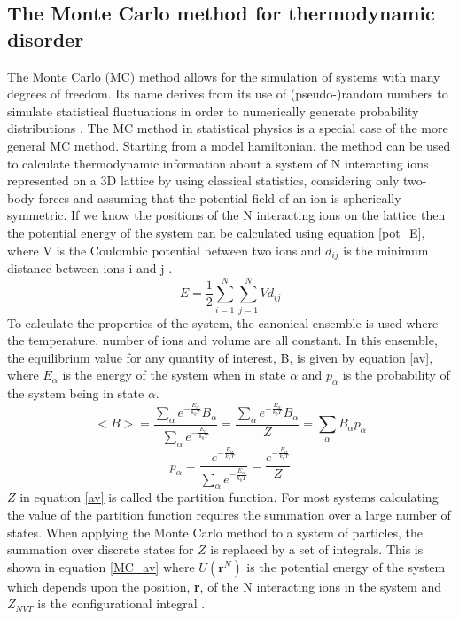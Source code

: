 \documentclass[11pt, twoside]{report}
\begin{document}
\subsection{The Monte Carlo method for thermodynamic disorder}
The Monte Carlo (MC) method allows for the simulation of systems with many degrees of freedom. Its name derives from its use of (pseudo-)random numbers to simulate statistical fluctuations in order to numerically generate probability distributions \cite{MC3}.
The MC method in statistical physics is a special case of the more general MC method.
Starting from a model hamiltonian, the method can be used to calculate thermodynamic information about a system of N interacting ions represented on a 3D lattice by using classical statistics, considering only two-body forces and assuming that the potential field of an ion is spherically symmetric. If we know the positions of the N interacting ions on the lattice then the potential energy of the system can be calculated using equation \ref{pot_E}, where V is the Coulombic potential between two ions and $d_{ij}$ is the minimum distance between ions i and j \cite{Metropolis}.
\begin{equation}\label{pot_E}
E = \frac{1}{2} \sum_{i=1}^N \sum_{j=1}^N V d_{ij}
\end{equation}
To calculate the properties of the system, the canonical ensemble is used where the temperature, number of ions and volume are all constant. In this ensemble, the equilibrium value for any quantity of interest, B, is given by equation \ref{av}, where $E_\alpha$ is the energy of the system when in state $\alpha$ and $p_\alpha$ is the probability of the system being in state $\alpha$.
\begin{equation}\label{av}
<B> = \frac{ \sum_\alpha e^{-\frac{E_\alpha}{k_bT}} B_\alpha}{ \sum_\alpha e^{-\frac{E_\alpha}{k_bT}}} = \frac{ \sum_\alpha e^{-\frac{E_\alpha}{k_bT}} B_\alpha}{Z} = \sum_\alpha B_\alpha p_\alpha
\end{equation}
\begin{equation}\label{prob}
p_\alpha = \frac{  e^{-\frac{E_\alpha}{k_bT}} }{ \sum_{\alpha} e^{-\frac{E_\alpha}{k_bT}}} =\frac{  e^{-\frac{E_\alpha}{k_bT}} }{Z}
\end{equation}
$Z$ in equation \ref{av} is called the partition function. For most systems calculating the value of the partition function requires the summation over a large number of states. When applying the Monte Carlo method to a system of particles, the summation over discrete states for $Z$ is replaced by a set of integrals. This is shown in equation \ref{MC_av} where $U(\mathbf{r}^N)$ is the potential energy of the system which depends upon the position, \textbf{r}, of the N interacting ions in the system and $Z_{NVT}$ is the configurational integral \cite{Lesar3}.
\end{document}
